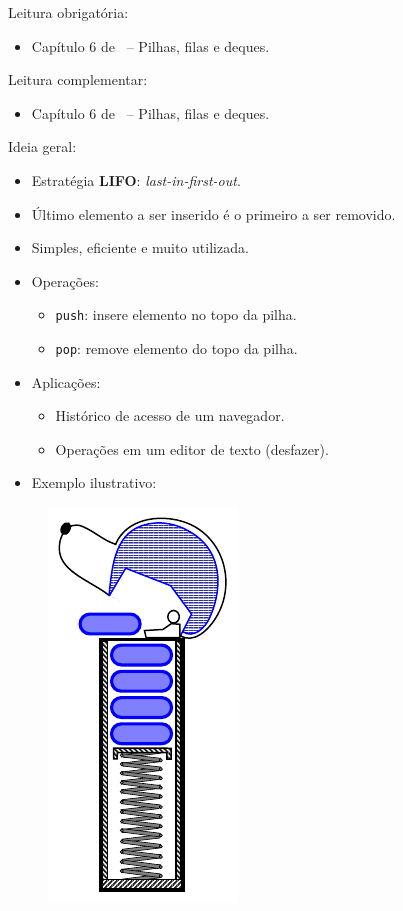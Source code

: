 \newcommand{\defs}{../defs}


\newcommand{\content}{Pilhas, filas e deques}
\newcommand{\class}{Algoritmos e Estruturas de Dados}
\newcommand{\shortcourse}{45EST}



\makeheader

{
Leitura obrigatória:
\begin{itemize}
	\item Capítulo 6 de~\cite{GoodrichEtAl2014} -- Pilhas, filas e deques.
\end{itemize}

Leitura complementar:
\begin{itemize}
	\item Capítulo 6 de~\cite{Preiss2001} -- Pilhas, filas e deques.
\end{itemize}
}

\medskip


Ideia geral:
\begin{itemize}
	\item Estratégia \textbf{LIFO}: \textit{last-in-first-out}.
	\item Último elemento a ser inserido é o primeiro a ser removido.
	\item {\color{redtext} Simples, eficiente e muito utilizada.}
	\item Operações:
	\begin{itemize}
		\item \texttt{push}: insere elemento no topo da pilha.
		\item \texttt{pop}: remove elemento do topo da pilha.
	\end{itemize}
	\item Aplicações:
	\begin{itemize}
		\item Histórico de acesso de um navegador.
		\item Operações em um editor de texto (desfazer).
	\end{itemize}
\end{itemize}

\clearpage

\begin{itemize}
	\item Exemplo ilustrativo:
\end{itemize}

\begin{figure}[H]
	\centering
	\includegraphics[width=0.21\linewidth]{img/figure-6-1}
\end{figure}

